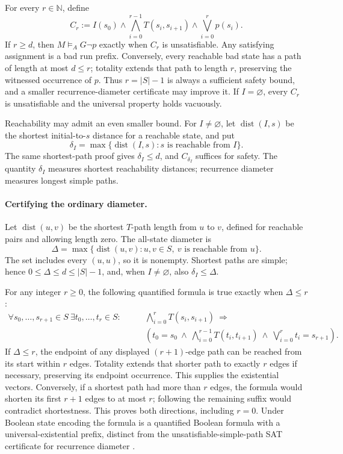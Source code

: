 For every \(r\in\mathbb N\), define
\[
 C_r:=I(s_0)\land
       \bigwedge_{i=0}^{r-1}T(s_i,s_{i+1})
       \land\bigvee_{i=0}^{r}p(s_i).
\]
If \(r\geq d\), then \(M\models_A G\neg p\) exactly when \(C_r\) is
unsatisfiable.
Any satisfying assignment is a bad run prefix. Conversely, every reachable
bad state has a path of length at most \(d\leq r\); totality extends that
path to length \(r\), preserving the witnessed occurrence of \(p\).
Thus \(r=|S|-1\) is always a sufficient safety bound, and a smaller
recurrence-diameter certificate may improve it. If \(I=\varnothing\), every
\(C_r\) is unsatisfiable and the universal property holds vacuously.

Reachability may admit an even smaller bound. For \(I\ne\varnothing\), let
\(\operatorname{dist}(I,s)\) be the shortest initial-to-\(s\) distance for a
reachable state, and put
\[
 \delta_I=\max\{\operatorname{dist}(I,s):s\text{ is reachable from }I\}.
\]
The same shortest-path proof gives
\(\delta_I\leq d\), and \(C_{\delta_I}\) suffices for safety. The quantity
\(\delta_I\) measures shortest reachability distances; recurrence diameter
measures longest simple paths.

\paragraph{Certifying the ordinary diameter.}
Let \(\operatorname{dist}(u,v)\) be the shortest \(T\)-path
length from \(u\) to \(v\), defined for reachable pairs and
allowing length zero. The all-state diameter is
\[
 \Delta=\max\{\operatorname{dist}(u,v):
                   u,v\in S,\ v\text{ is reachable from }u\}.
\]
The set includes every \((u,u)\), so it is nonempty.
Shortest paths are simple; hence
\(0\leq\Delta\leq d\leq|S|-1\), and, when
\(I\ne\varnothing\), also \(\delta_I\leq\Delta\).

For any integer \(r\geq0\), the following quantified formula
is true exactly when \(\Delta\leq r\):
\[
\begin{split}
 \forall s_0,\ldots,s_{r+1}\in S\
 \exists t_0,\ldots,t_r\in S:\qquad&
 \bigwedge_{i=0}^{r}T(s_i,s_{i+1})
 \ \Rightarrow\\
 &\left(t_0=s_0\ \land\
     \bigwedge_{i=0}^{r-1}T(t_i,t_{i+1})
       \ \land\ \bigvee_{i=0}^{r}t_i=s_{r+1}\right).
\end{split}
\]
If \(\Delta\leq r\), the endpoint of any displayed
\((r+1)\)-edge path can be reached from its start within
\(r\) edges. Totality extends that shorter path to exactly
\(r\) edges if necessary, preserving its endpoint occurrence.
This supplies the existential vectors. Conversely, if a
shortest path had more than \(r\) edges, the formula would
shorten its first \(r+1\) edges to at most \(r\); following
the remaining suffix would contradict shortestness.
This proves both directions, including \(r=0\).
Under Boolean state encoding the formula is a quantified
Boolean formula with a universal-existential prefix,
distinct from the unsatisfiable-simple-path SAT certificate
for recurrence diameter
\cite[def.~19 and thms.~20--21]{BiereCimattiClarkeZhu1999}.

